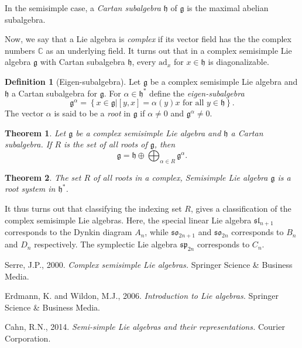 \documentclass[twoside,utf8]{article}
\theoremstyle{plain}
\newtheorem{theorem}{Theorem}
\theoremstyle{definition}
\newtheorem{definition}{Definition}
\theoremstyle{remark}
\begin{document}
\noindent
In the semisimple case, a \textit{Cartan subalgebra} $\mathfrak{h}$ of $\mathfrak{g}$ is the maximal abelian subalgebra. 

Now, we say that a Lie algebra is \textit{complex} if its vector field has the the complex numbers $\mathbb{C}$ as an underlying field. It turns out that in a complex semisimple Lie algebra $\mathfrak{g}$ with Cartan subalgebra $\mathfrak{h}$, every $\mbox{ad}_x$ for $x\in \mathfrak{h}$ is diagonalizable. 

\begin{definition}[Eigen-subalgebra]
Let $\mathfrak{g}$ be a complex semisimple Lie algebra and $\mathfrak{h}$ a Cartan subalgebra for $\mathfrak{g}$. For $\alpha \in \mathfrak{h}^*$ define the \textit{eigen-subalgebra}
\[
\mathfrak{g}^\alpha = \left\{ x \in \mathfrak{g} \big| [y,x]=\alpha(y)x \mbox{ for all } y \in \mathfrak{h} \right\}.
\]
The vector $\alpha$ is said to be a \textit{root} in $\mathfrak{g}$ if $\alpha \neq 0$ and $\mathfrak{g}^\alpha \neq 0$. 
\end{definition}

\begin{theorem}
Let $\mathfrak{g}$ be a complex semisimple Lie algebra and $\mathfrak{h}$ a Cartan subalgebra. If $R$ is the set of all roots of $\mathfrak{g}$, then 
\[
\mathfrak{g} = \mathfrak{h} \oplus \bigoplus_{\alpha \in R} \mathfrak{g}^\alpha.
\]
\end{theorem}


\begin{theorem}
The set $R$ of all roots in a complex, Semisimple Lie algebra $\mathfrak{g}$ is a root system in $\mathfrak{h}^*$.
\end{theorem}

\noindent
It thus turns out that classifying the indexing set $R$, gives a classification of the complex semisimple Lie algebras. Here, the special linear Lie algebra $\mathfrak{sl}_{n+1}$ corresponds to the Dynkin diagram $A_n$, while $\mathfrak{so}_{2n+1}$ and $\mathfrak{so}_{2n}$ corresponds to $B_n$ and $D_n$ respectively. The symplectic Lie algebra $\mathfrak{sp}_{2n}$ corresponds to $C_n$.





\begin{thebibliography}{99} %

 Serre, J.P., 2000. 
 \newblock \textit{Complex semisimple Lie algebras.}
 \newblock Springer Science \& Business Media.
 
 Erdmann, K. and Wildon, M.J., 2006. 
 \newblock \textit{Introduction to Lie algebras.} 
 \newblock Springer Science \& Business Media.
 
 Cahn, R.N., 2014. 
 \newblock \textit{Semi-simple Lie algebras and their representations.}
 \newblock Courier Corporation.

\end{thebibliography}
\end{document}
